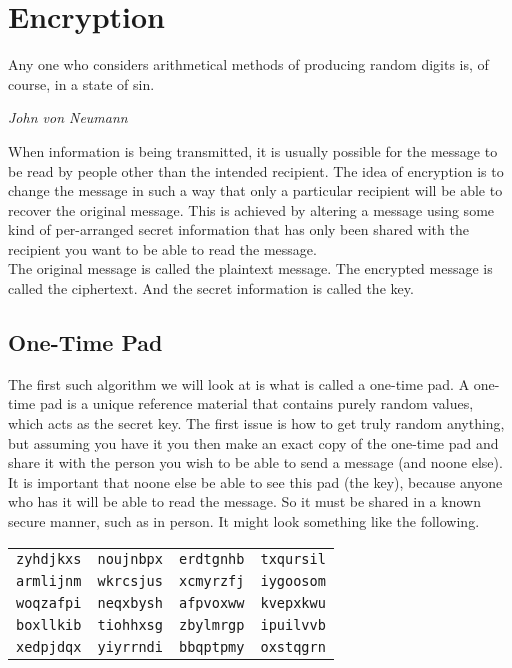 \chapter{Encryption}

\epigraph{Any one who considers arithmetical methods of producing random digits is, of course, in a state of sin.}{\textit{John von Neumann}}


When information is being transmitted, it is usually possible for the message to be read by people other than the intended recipient. The idea of encryption is to change the message in such a way that only a particular recipient will be able to recover the original message. This is achieved by altering a message using some kind of per-arranged secret information that has only been shared with the recipient you want to be able to read the message.\\

The original message is called the plaintext message. The encrypted message is called the ciphertext. And the secret information is called the key.\\

\section{One-Time Pad}

The first such algorithm we will look at is what is called a one-time pad. A one-time pad is a unique reference material that contains purely random values, which acts as the secret key. The first issue is how to get truly random anything, but assuming you have it you then make an exact copy of the one-time pad and share it with the person you wish to be able to send a message (and noone else). It is important that noone else be able to see this pad (the key), because anyone who has it will be able to read the message. So it must be shared in a known secure manner, such as in person. It might look something like the following.\\

\begin{center}
	\begin{tabular}{c | c | c | c }
		 \texttt{zyhdjkxs} & \texttt{noujnbpx} & \texttt{erdtgnhb} & \texttt{txqursil}\\
		 \texttt{armlijnm} & \texttt{wkrcsjus} & \texttt{xcmyrzfj} & \texttt{iygoosom}\\
		 \texttt{woqzafpi} & \texttt{neqxbysh} & \texttt{afpvoxww} & \texttt{kvepxkwu}\\
		 \texttt{boxllkib} & \texttt{tiohhxsg} & \texttt{zbylmrgp} & \texttt{ipuilvvb}\\
		 \texttt{xedpjdqx} & \texttt{yiyrrndi} & \texttt{bbqptpmy} & \texttt{oxstqgrn}\\
	\end{tabular}
\end{center}

